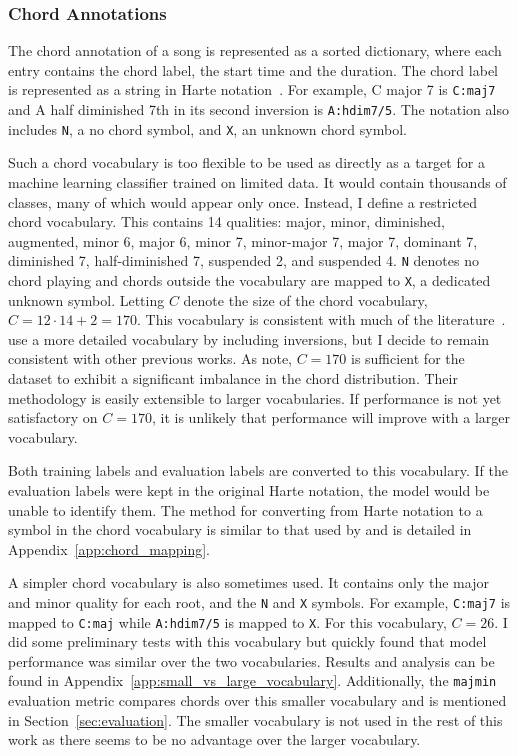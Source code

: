 \subsubsection{Chord Annotations}\label{sec:chord-annotations}

The chord annotation of a song is represented as a sorted dictionary, where each entry contains the chord label, the start time and the duration. The chord label is represented as a string in Harte notation~\citep{HarteNotation}. For example, C major 7 is \texttt{C:maj7} and A half diminished 7th in its second inversion is \texttt{A:hdim7/5}. The notation also includes \texttt{N}, a no chord symbol, and \texttt{X}, an unknown chord symbol.

Such a chord vocabulary is too flexible to be used as directly as a target for a machine learning classifier trained on limited data. It would contain thousands of classes, many of which would appear only once. Instead, I define a restricted chord vocabulary. This contains 14 qualities: major, minor, diminished, augmented, minor 6, major 6, minor 7, minor-major 7, major 7, dominant 7, diminished 7, half-diminished 7, suspended 2, and suspended 4. \texttt{N} denotes no chord playing and chords outside the vocabulary are mapped to \texttt{X}, a dedicated unknown symbol. Letting $C$ denote the size of the chord vocabulary, $C=12\cdot14 + 2 = 170$. This vocabulary is consistent with much of the literature~\citep{StructuredTraining,FourTimelyInsights,ACRLargeVocab1}. \citet{ACRLargeVocab1} use a more detailed vocabulary by including inversions, but I decide to remain consistent with other previous works. As \citet{StructuredTraining} note, $C=170$ is sufficient for the dataset to exhibit a significant imbalance in the chord distribution. Their methodology is easily extensible to larger vocabularies. If performance is not yet satisfactory on $C=170$, it is unlikely that performance will improve with a larger vocabulary.

Both training labels and evaluation labels are converted to this vocabulary. If the evaluation labels were kept in the original Harte notation, the model would be unable to identify them. The method for converting from Harte notation to a symbol in the chord vocabulary is similar to that used by \citet{StructuredTraining} and is detailed in Appendix~\ref{app:chord_mapping}.

A simpler chord vocabulary is also sometimes used. It contains only the major and minor quality for each root, and the \texttt{N} and \texttt{X} symbols. For example, \texttt{C:maj7} is mapped to \texttt{C:maj} while \texttt{A:hdim7/5} is mapped to \texttt{X}. For this vocabulary, $C=26$. I did some preliminary tests with this vocabulary but quickly found that model performance was similar over the two vocabularies. Results and analysis can be found in Appendix~\ref{app:small_vs_large_vocabulary}. Additionally, the \texttt{majmin} evaluation metric compares chords over this smaller vocabulary and is mentioned in Section~\ref{sec:evaluation}. The smaller vocabulary is not used in the rest of this work as there seems to be no advantage over the larger vocabulary.

